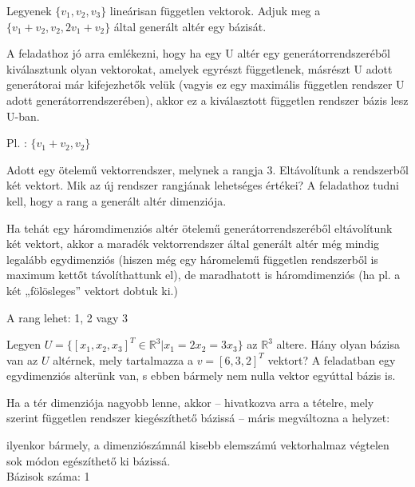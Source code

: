 \begin{frame}
  \begin{tcolorbox}[title={3/9. {\symknight}}]
     Legyenek $\{v_1,v_2,v_3\}$ lineárisan független vektorok. Adjuk meg a $\{v_1 + v_2,v_2,2v_1 + v_2\}$ által generált altér egy bázisát.

  \tcblower
A feladathoz jó arra emlékezni, hogy ha egy U altér egy generátorrendszeréből kiválasztunk olyan vektorokat, amelyek egyrészt függetlenek, másrészt U adott generátorai már kifejezhetők velük (vagyis ez egy maximális független rendszer U adott generátorrendszerében), akkor ez a kiválasztott független rendszer bázis lesz U-ban.\\
    \mmedskip 
  
     Pl. : $\{v_1 + v_2,v_2\}$
  \end{tcolorbox}
\end{frame}


\begin{frame}
  \begin{tcolorbox}[title={3/10. {\symqueen}}]
     Adott egy ötelemű vektorrendszer, melynek a rangja $3.$ Eltávolítunk a rendszerből két vektort. Mik az új rendszer rangjának lehetséges értékei?
  \tcblower
    A feladathoz tudni kell, hogy a rang a generált altér dimenziója.\\
    \mmedskip
    
    Ha tehát egy háromdimenziós altér ötelemű generátorrendszeréből eltávolítunk két vektort, akkor a maradék vektorrendszer által generált altér még mindig legalább egydimenziós (hiszen még egy háromelemű független rendszerből is maximum kettőt távolíthattunk el), de maradhatott is háromdimenziós (ha pl. a két „fölösleges” vektort dobtuk ki.)\\
    \mmedskip 
  
     A rang lehet: 1, 2 vagy 3
  \end{tcolorbox}
\end{frame}


\begin{frame}
  \begin{tcolorbox}[title={3/11. {\symqueen}}]
     Legyen $U = \{[x_1,x_2,x_3]^T \in \mathbb{R}^3|x_1 = 2x_2 = 3x_3\}$ az $\mathbb{R}^3$ altere. Hány olyan bázisa van az $U$ altérnek, mely tartalmazza a $v = [6,3,2]^T$ vektort?
  \tcblower  
    A feladatban egy egydimenziós alterünk van, s ebben bármely nem nulla vektor egyúttal bázis is.\\
    \mmedskip
    
    Ha a tér dimenziója nagyobb lenne, akkor – hivatkozva arra a tételre, mely szerint független rendszer kiegészíthető bázissá – máris megváltozna a helyzet:\\
    \mmedskip
    
    ilyenkor bármely, a dimenziószámnál kisebb elemszámú vektorhalmaz végtelen sok módon egészíthető ki bázissá.\\
    \mmedskip 
    Bázisok száma: 1
  \end{tcolorbox}
\end{frame}


